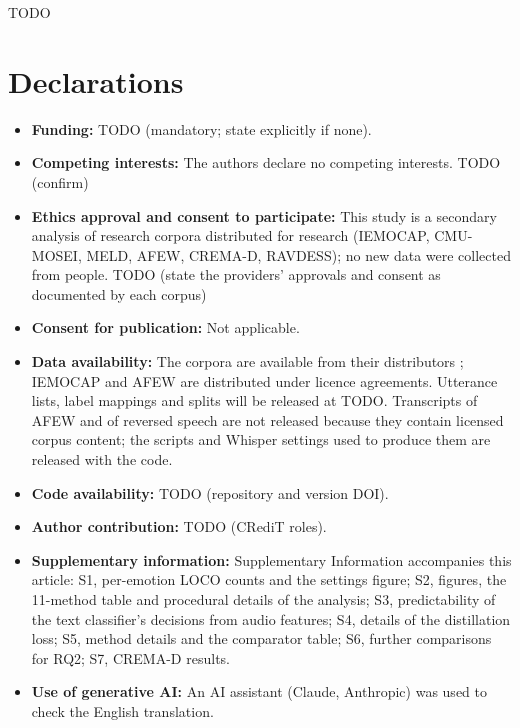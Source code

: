 \documentclass[sn-nature,pdflatex]{sn-jnl}
\begin{document}










\backmatter

TODO

\section*{Declarations}

\begin{itemize}
\item \textbf{Funding:} TODO (mandatory; state explicitly if none).
\item \textbf{Competing interests:} The authors declare no competing interests. TODO (confirm)
\item \textbf{Ethics approval and consent to participate:} This study is a secondary analysis of research corpora distributed for research (IEMOCAP, CMU-MOSEI, MELD, AFEW, CREMA-D, RAVDESS); no new data were collected from people. TODO (state the providers' approvals and consent as documented by each corpus)
\item \textbf{Consent for publication:} Not applicable.
\item \textbf{Data availability:} The corpora are available from their distributors \cite{busso2008iemocap,zadeh2018mosei,poria2019meld,dhall2012afew,cao2014cremad,livingstone2018ravdess}; IEMOCAP and AFEW are distributed under licence agreements. Utterance lists, label mappings and splits will be released at TODO. Transcripts of AFEW and of reversed speech are not released because they contain licensed corpus content; the scripts and Whisper settings used to produce them are released with the code.
\item \textbf{Code availability:} TODO (repository and version DOI).
\item \textbf{Author contribution:} TODO (CRediT roles).
\item \textbf{Supplementary information:} Supplementary Information accompanies this article: S1, per-emotion LOCO counts and the settings figure; S2, figures, the 11-method table and procedural details of the analysis; S3, predictability of the text classifier's decisions from audio features; S4, details of the distillation loss; S5, method details and the comparator table; S6, further comparisons for RQ2; S7, CREMA-D results.
\item \textbf{Use of generative AI:} An AI assistant (Claude, Anthropic) was used to check the English translation.
\end{itemize}




\end{document}
